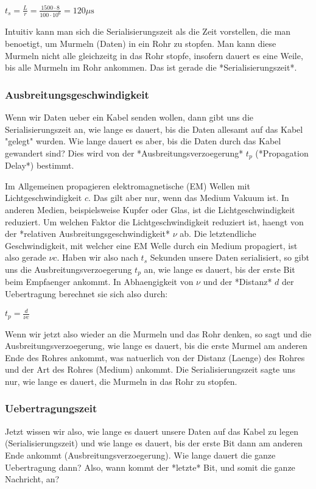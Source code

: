 $t_s = \frac{L}{r} = \frac{1500 \cdot 8}{100 \cdot 10^6} = 120 \mu\text{s}$

Intuitiv kann man sich die Serialisierungszeit als die Zeit vorstellen, die man
benoetigt, um Murmeln (Daten) in ein Rohr zu stopfen. Man kann diese Murmeln
nicht alle gleichzeitg in das Rohr stopfe, insofern dauert es eine Weile, bis
alle Murmeln im Rohr ankommen. Das ist gerade die *Serialisierungszeit*.

\subsubsection{Ausbreitungsgeschwindigkeit} 

Wenn wir Daten ueber ein Kabel senden wollen, dann gibt uns die
Serialisierungszeit an, wie lange es dauert, bis die Daten allesamt auf das
Kabel "gelegt" wurden. Wie lange dauert es aber, bis die Daten durch das Kabel
gewandert sind? Dies wird von der *Ausbreitungsverzoegerung* $t_p$ (*Propagation
Delay*) bestimmt.

Im Allgemeinen propagieren elektromagnetische (EM) Wellen mit
Lichtgeschwindigkeit $c$. Das gilt aber nur, wenn das Medium Vakuum ist. In
anderen Medien, beispielsweise Kupfer oder Glas, ist die Lichtgeschwindigkeit
reduziert. Um welchen Faktor die Lichtgeschwindigkeit reduziert ist, haengt von
der *relativen Ausbreitungsgeschwindigkeit* $\nu$ ab. Die letztendliche
Geschwindigkeit, mit welcher eine EM Welle durch ein Medium propagiert, ist also
gerade $\nu c$. Haben wir also nach $t_s$ Sekunden unsere Daten serialisiert, so
gibt uns die Ausbreitungsverzoegerung $t_p$ an, wie lange es dauert, bis der
erste Bit beim Empfaenger ankommt. In Abhaengigkeit von $\nu$ und der *Distanz*
$d$ der Uebertragung berechnet sie sich also durch:

$t_p = \frac{d}{\nu c}$

Wenn wir jetzt also wieder an die Murmeln und das Rohr denken, so sagt und die
Ausbreitungsverzoegerung, wie lange es dauert, bis die erste Murmel am anderen
Ende des Rohres ankommt, was natuerlich von der Distanz (Laenge) des Rohres und
der Art des Rohres (Medium) ankommt. Die Serialisierungszeit sagte uns nur, wie
lange es dauert, die Murmeln in das Rohr zu stopfen.

\subsubsection{Uebertragungszeit} 

Jetzt wissen wir also, wie lange es dauert unsere Daten auf das Kabel zu legen
(Serialisierungszeit) und wie lange es dauert, bis der erste Bit dann am anderen
Ende ankommt (Ausbreitungsverzoegerung). Wie lange dauert die ganze Uebertragung
dann? Also, wann kommt der *letzte* Bit, und somit die ganze Nachricht, an?

